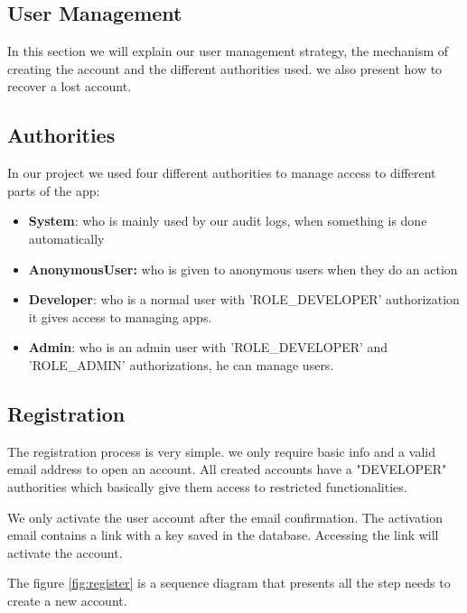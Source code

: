 \begin{spacing}{1.2}
\section{User Management}
In this section we will explain our user management strategy, the mechanism of creating the account and the different authorities used. we also present how to recover a lost account.
\subsection{Authorities}
In our project we used four different authorities to manage access to different parts of the app:
\begin{itemize}
	\item \textbf{System}: who is mainly used by our audit logs, when something is done automatically
	\item \textbf{AnonymousUser:} who is given to anonymous users when they do an action
	\item \textbf{Developer}: who is a normal user with 'ROLE\_DEVELOPER' authorization it gives access to managing apps.
	\item  \textbf{Admin}: who is an admin user with 'ROLE\_DEVELOPER' and 'ROLE\_ADMIN' authorizations, he can manage users.
\end{itemize}

\subsection{Registration}
The registration process is very simple. we only require basic info and a valid email address to open an account. All created accounts have a "DEVELOPER" authorities which basically give them access to restricted functionalities. 

We only activate the user account after the email confirmation. The activation email contains a link with a key saved in the database. Accessing the link will activate the account.

The figure \ref{fig:register} is a sequence diagram that presents all the step needs to create a new account.


\end{spacing}
